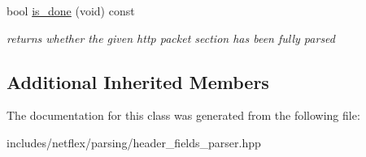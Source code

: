 \begin{DoxyCompactItemize}
\mbox{\label{classnetflex_1_1parsing_1_1header__fields__parser_a8303c3f2910b9baa68b9b0313e0438cf}} 
bool \hyperlink{classnetflex_1_1parsing_1_1header__fields__parser_a8303c3f2910b9baa68b9b0313e0438cf}{is\+\_\+done} (void) const
\begin{DoxyCompactList}\small\item\em returns whether the given http packet section has been fully parsed \end{DoxyCompactList}\end{DoxyCompactItemize}
\subsection*{Additional Inherited Members}


The documentation for this class was generated from the following file\+:\begin{DoxyCompactItemize}
\item 
includes/netflex/parsing/header\+\_\+fields\+\_\+parser.\+hpp\end{DoxyCompactItemize}
